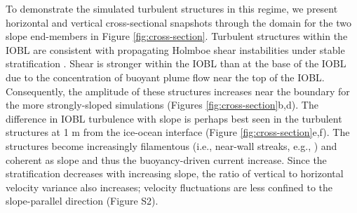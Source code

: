 \documentclass[draft]{agujournal2019}
\begin{document}
To demonstrate the simulated turbulent structures in this regime, we present horizontal and vertical cross-sectional  snapshots through the domain for the two slope end-members in Figure \ref{fig:cross-section}. Turbulent structures within the IOBL are consistent with propagating Holmboe shear instabilities under stable stratification \cite{carpenter_identifying_2010}. Shear is stronger within the IOBL than at the base of the IOBL due to the concentration of buoyant plume flow near the top of the IOBL. Consequently, the amplitude of these structures increases near the boundary for the more strongly-sloped simulations (Figures \ref{fig:cross-section}b,d). The difference in IOBL turbulence with slope is perhaps best seen in the turbulent structures at 1 m from the ice-ocean interface (Figure \ref{fig:cross-section}e,f). The structures become increasingly filamentous (i.e., near-wall streaks, e.g., ) and coherent as slope and thus the buoyancy-driven current increase. Since the stratification decreases with increasing slope, the ratio of vertical to horizontal velocity variance also increases;  velocity fluctuations are less confined to the slope-parallel direction (Figure S2). 
\end{document}
